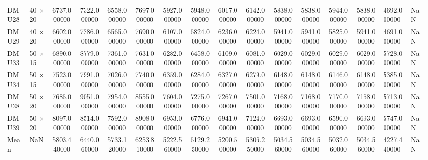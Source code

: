 \begin{tabular}{llcccccccccccc}
DMU28 & 40 × 20 & 6737.000000 & 7322.000000 & 6558.000000 & 7697.000000 & 5927.000000 & 5948.000000 & 6017.000000 & 6142.000000 & 5838.000000 & 5838.000000 & 5944.000000 & 5838.000000 & 4692.000000 & NaN \\
DMU29 & 40 × 20 & 6602.000000 & 7386.000000 & 6565.000000 & 7690.000000 & 6107.000000 & 5824.000000 & 6236.000000 & 6224.000000 & 5941.000000 & 5941.000000 & 5825.000000 & 5941.000000 & 4691.000000 & NaN \\
DMU33 & 50 × 15 & 6890.000000 & 8779.000000 & 7361.000000 & 7631.000000 & 6282.000000 & 6458.000000 & 6109.000000 & 6081.000000 & 6029.000000 & 6029.000000 & 6029.000000 & 6029.000000 & 5728.000000 & NaN \\
DMU34 & 50 × 15 & 7523.000000 & 7991.000000 & 7026.000000 & 7740.000000 & 6359.000000 & 6284.000000 & 6327.000000 & 6279.000000 & 6148.000000 & 6148.000000 & 6146.000000 & 6148.000000 & 5385.000000 & NaN \\
DMU38 & 50 × 20 & 7685.000000 & 9051.000000 & 7954.000000 & 8555.000000 & 7604.000000 & 7275.000000 & 7267.000000 & 7501.000000 & 7168.000000 & 7168.000000 & 7170.000000 & 7168.000000 & 5713.000000 & NaN \\
DMU39 & 50 × 20 & 8097.000000 & 8514.000000 & 7592.000000 & 8908.000000 & 6953.000000 & 6776.000000 & 6941.000000 & 7124.000000 & 6693.000000 & 6693.000000 & 6590.000000 & 6693.000000 & 5747.000000 & NaN \\
Mean & NaN & 5803.440000 & 6440.060000 & 5733.120000 & 6253.810000 & 5222.560000 & 5129.250000 & 5200.500000 & 5306.250000 & 5034.560000 & 5034.560000 & 5032.060000 & 5034.560000 & 4227.440000 & NaN \\
\bottomrule
\end{tabular}
